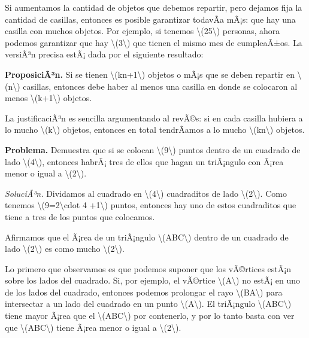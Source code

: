 \documentclass[
]{article}
\makeatletter
\newcommand*\pandocbounded[1]{%
  \sbox\pandoc@box{#1}%
  \Gscale@div\@tempa{\textheight}{\dimexpr\ht\pandoc@box+\dp\pandoc@box\relax}%
  \Gscale@div\@tempb{\linewidth}{\wd\pandoc@box}%
  \ifdim\@tempb\p@<\@tempa\p@\let\@tempa\@tempb\fi%
  \ifdim\@tempa\p@<\p@\scalebox{\@tempa}{\usebox\pandoc@box}%
  \else\usebox{\pandoc@box}%
  \fi%
}
\makeatother
\begin{document}
Si aumentamos la cantidad de objetos que debemos repartir, pero dejamos
fija la cantidad de casillas, entonces es posible garantizar todavÃ­a
mÃ¡s: que hay una casilla con muchos objetos. Por ejemplo, si tenemos
{\textbackslash(25\textbackslash)} personas, ahora podemos garantizar
que hay {\textbackslash(3\textbackslash)} que tienen el mismo mes de
cumpleaÃ±os. La versiÃ³n precisa estÃ¡ dada por el siguiente resultado:

\textbf{ProposiciÃ³n.} Si se tienen {\textbackslash(kn+1\textbackslash)}
objetos o mÃ¡s que se deben repartir en
{\textbackslash(n\textbackslash)} casillas, entonces debe haber al menos
una casilla en donde se colocaron al menos
{\textbackslash(k+1\textbackslash)} objetos.

La justificaciÃ³n es sencilla argumentando al revÃ©s: si en cada casilla
hubiera a lo mucho {\textbackslash(k\textbackslash)} objetos, entonces
en total tendrÃ­amos a lo mucho {\textbackslash(kn\textbackslash)}
objetos.

\textbf{Problema.} Demuestra que si se colocan
{\textbackslash(9\textbackslash)} puntos dentro de un cuadrado de lado
{\textbackslash(4\textbackslash)}, entonces habrÃ¡ tres de ellos que
hagan un triÃ¡ngulo con Ã¡rea menor o igual a
{\textbackslash(2\textbackslash)}.

\emph{SoluciÃ³n.} Dividamos al cuadrado en
{\textbackslash(4\textbackslash)} cuadraditos de lado
{\textbackslash(2\textbackslash)}. Como tenemos
{\textbackslash(9=2\textbackslash cdot 4 +1\textbackslash)} puntos,
entonces hay uno de estos cuadraditos que tiene a tres de los puntos que
colocamos.

\pandocbounded{}

Afirmamos que el Ã¡rea de un triÃ¡ngulo
{\textbackslash(ABC\textbackslash)} dentro de un cuadrado de lado
{\textbackslash(2\textbackslash)} es como mucho
{\textbackslash(2\textbackslash)}.

Lo primero que observamos es que podemos suponer que los vÃ©rtices
estÃ¡n sobre los lados del cuadrado. Si, por ejemplo, el vÃ©rtice
{\textbackslash(A\textbackslash)} no estÃ¡ en uno de los lados del
cuadrado, entonces podemos prolongar el rayo
{\textbackslash(BA\textbackslash)} para intersectar a un lado del
cuadrado en un punto {\textbackslash(A\textquotesingle\textbackslash)}.
El triÃ¡ngulo {\textbackslash(A\textquotesingle BC\textbackslash)} tiene
mayor Ã¡rea que el {\textbackslash(ABC\textbackslash)} por contenerlo, y
por lo tanto basta con ver que
{\textbackslash(A\textquotesingle BC\textbackslash)} tiene Ã¡rea menor o
igual a {\textbackslash(2\textbackslash)}.
\end{document}
